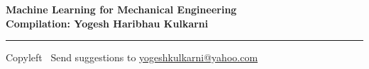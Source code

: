 % 



% 


\graphicspath{{images/}}



\footnotesize


\begin{center}
\Large{\textbf{Machine Learning for Mechanical Engineering\\ Compilation: Yogesh Haribhau Kulkarni}}  
\end{center}


\begin{multicols}{2}
	
\end{multicols}

\rule{\linewidth}{0.25pt}
\scriptsize
Copyleft \textcopyleft\  Send suggestions to 
\href{http://www.yogeshkulkarni.com}{yogeshkulkarni@yahoo.com}


